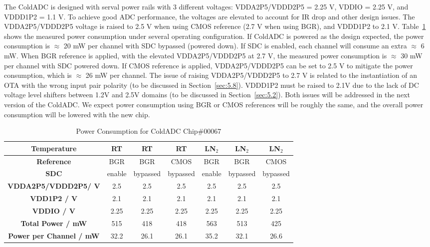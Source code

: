 \label{sec:4.5}


The ColdADC is designed with serval power rails with 3 different voltages: VDDA2P5/VDDD2P5 = 2.25 V, VDDIO = 2.25 V, 
and VDDD1P2 = 1.1 V. To achieve good ADC performance, the voltages are elevated to account for IR drop and other
design issues. The  VDDA2P5/VDDD2P5 voltage is raised to 2.5 V when using CMOS reference (2.7 V when using BGR), and 
VDDD1P2 to 2.1 V.
Table~\ref{tab:powerconsumed} shows the measured power consumption under several operating configuration. If ColdADC is powered as 
the design expected, the power consumption is $\approx$ 20 mW per channel with SDC  bypassed (powered down).  If SDC is enabled, 
each channel will consume an extra $\approx$ 6 mW.  When BGR reference is applied, with the elevated VDDA2P5/VDDD2P5 at 2.7 V, the measured
power consumption is $\approx$ 30 mW per channel with SDC powered down.  If CMOS reference is applied, VDDA2P5/VDDD2P5 can be set to 
2.5 V to mitigate the power consumption, which is $\approx$ 26 mW per channel. The issue of raising VDDA2P5/VDDD2P5 to 2.7 V is 
related to the instantiation of an OTA with the wrong input pair polarity (to be discussed in Section~\ref{sec:5.8}).  VDDD1P2 must 
be raised to 2.1V due to the lack of DC voltage level shifters between 1.2V and 2.5V domains (to be discussed in Section~\ref{sec:5.2}). 
Both issues will be addressed in the next version of the ColdADC. We expect power consumption using 
BGR or CMOS references will be roughly the same, and the overall power consumption will be lowered with the new chip.
\begin{table}[h]
\centering
\begin{tabular}{|c|c|c|c|c|c|c|}
\hline
\textbf{Temperature} & RT & RT & RT & LN$_2$ & LN$_2$ & LN$_2$ \\ \hline
\textbf{Reference} & BGR & BGR & CMOS & BGR & BGR & CMOS \\ \hline
\textbf{SDC} & enable & bypassed & bypassed & enable & bypassed & bypassed \\ \hline
\textbf{VDDA2P5/VDDD2P5/ V} & 2.5 &2.5 &2.5 &2.5 &2.5 &2.5 \\ \hline
\textbf{VDD1P2 / V} & 2.1 & 2.1 & 2.1 & 2.1 & 2.1 & 2.1 \\ \hline
\textbf{VDDIO / V} & 2.25 & 2.25 & 2.25 & 2.25 & 2.25 & 2.25  \\ \hline
\textbf{Total Power / mW} & 515 & 418 & 418 & 563 & 513 & 425 \\ \hline
\textbf{Power per Channel / mW} & 32.2 & 26.1 & 26.1 & 35.2 & 32.1 & 26.6 \\ \hline
\end{tabular}
\caption{Power Consumption for ColdADC Chip\#00067}
\label{tab:powerconsumed}
\end{table}  


